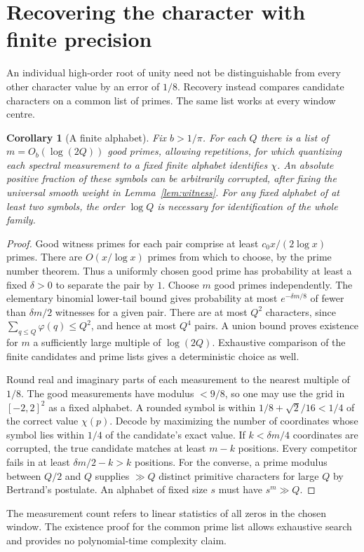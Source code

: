 \documentclass[11pt]{article}
\newtheorem{corollary}[theorem]{Corollary}
\begin{document}
\section{Recovering the character with finite precision}
An individual high-order root of unity need not be distinguishable from every
other character value by an error of $1/8$. Recovery instead compares candidate
characters on a common list of primes. The same list works at every window centre.
\begin{corollary}[A finite alphabet]\label{cor:code}
Fix $b>1/\pi$. For each $Q$ there is a list of $m=O_b(\log(2Q))$ good primes,
allowing repetitions, for which quantizing each spectral measurement to a
fixed finite alphabet identifies $\chi$. An absolute positive fraction of these
symbols can be arbitrarily corrupted, after fixing the universal smooth weight
in Lemma~\ref{lem:witness}. For any fixed alphabet of at least two symbols, the
order $\log Q$ is necessary for identification of the whole family.
\end{corollary}
\begin{proof}
Good witness primes for each pair comprise at least $c_0 x/(2\log x)$ primes.
There are $O(x/\log x)$ primes from which to choose, by the prime number theorem.
Thus a uniformly chosen good prime has probability at least a fixed $\delta>0$
to separate the pair by $1$. Choose $m$ good primes independently. The elementary
binomial lower-tail bound gives probability at most $e^{-\delta m/8}$ of fewer
than $\delta m/2$ witnesses for a given pair. There are at most $Q^2$
characters, since $\sum_{q\le Q}\varphi(q)\le Q^2$, and hence at most $Q^4$
pairs. A union bound proves existence for $m$ a sufficiently large multiple of
$\log(2Q)$. Exhaustive comparison of the finite candidates and prime lists gives
a deterministic choice as well.

Round real and imaginary parts of each measurement to the nearest multiple
of $1/8$. The good measurements have modulus $<9/8$, so one may use the grid
in $[-2,2]^2$ as a fixed alphabet. A rounded symbol is within
$1/8+\sqrt2/16<1/4$ of the correct value $\chi(p)$.
Decode by maximizing the number of coordinates whose symbol lies within
$1/4$ of the candidate's exact value. If $k<\delta m/4$ coordinates are
corrupted, the true candidate matches at least $m-k$ positions. Every competitor
fails in at least $\delta m/2-k>k$ positions. For the converse, a prime modulus
between $Q/2$ and $Q$ supplies $\gg Q$ distinct primitive characters for large
$Q$ by Bertrand's postulate. An alphabet of fixed size $s$ must have $s^m\gg Q$.
\end{proof}
The measurement count refers to linear statistics of all zeros in the chosen
window. The existence proof for the common prime list allows exhaustive search
and provides no polynomial-time complexity claim.
\end{document}
